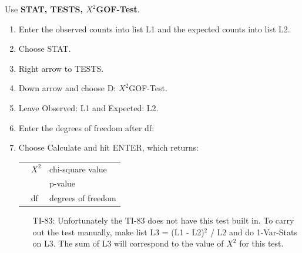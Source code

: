 \begin{termBox}{
Use \textbf{STAT, TESTS, $X^2$GOF-Test}.
\begin{enumerate}
\setlength{\itemsep}{0mm}
\item Enter the observed counts into list L1 and the expected counts into list L2.
\item Choose STAT.
\item Right arrow to TESTS.
\item Down arrow and choose D: $X^2$GOF-Test.
\item Leave Observed: L1 and Expected: L2.
\item Enter the degrees of freedom after df:
\item Choose Calculate and hit ENTER, which returns: \\
\begin{tabular}{l ll}
\hspace{3mm}&
	$X^2$
	&\quad chi-square value \\
&
	\text{p}
	&\quad p-value \\
&
	df
	&\quad  degrees of freedom
\end{tabular}
\begin{itemize}
\item[TI-83: ] Unfortunately the TI-83 does not have this test built in. To carry out the test manually, make list L3 = (L1 - L2)$^2$ / L2 and do 1-Var-Stats on L3. The sum of L3 will correspond to the value of $X^2$ for this test.
\end{itemize}
\end{enumerate}
}
\end{termBox}

